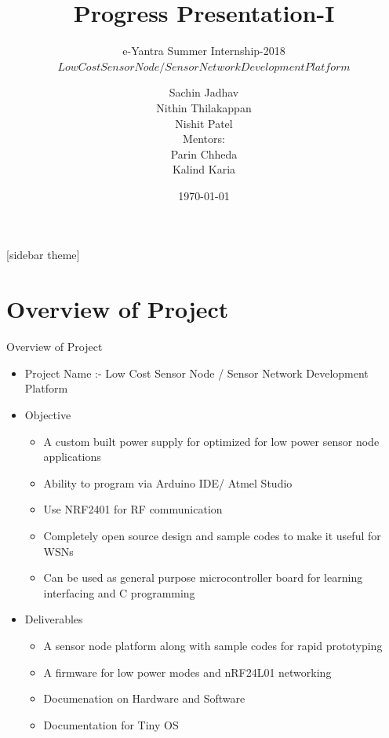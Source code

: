 \documentclass[10pt, a4paper]{beamer}
\begin{document}
	\title{Progress Presentation-I}
	\subtitle{e-Yantra Summer Internship-2018 \\ $Low Cost Sensor Node / Sensor Network Development Platform$}
	\author{Sachin Jadhav\\Nithin Thilakappan\\Nishit Patel\\
	Mentors:\\ Parin Chheda\\Kalind Karia}
	\date{\today}
	\frame{\titlepage}

[sidebar theme]
\section{Overview of Project}
\begin{frame}{Overview of Project}
	\begin{itemize}
		\item Project Name :- Low Cost Sensor Node / Sensor Network Development Platform 
		\item Objective
        	\begin{itemize}
        		\item A custom built power supply for optimized for low power sensor node applications
				\item Ability to program via Arduino IDE/ Atmel Studio
				\item Use NRF2401 for RF communication
				\item Completely open source design and sample codes to make it useful for WSNs
				\item Can be used as general purpose microcontroller board for learning interfacing and C
programming
                \end{itemize}
		\item Deliverables
        \begin{itemize}
        		\item A sensor node platform along with sample codes for rapid prototyping
				\item A firmware for low power modes and nRF24L01 networking
				\item Documenation on Hardware and Software
				\item Documentation for Tiny OS 
                \end{itemize} 
	\end{itemize}
\end{frame}
\end{document}
